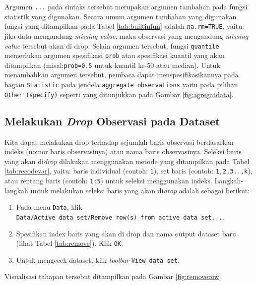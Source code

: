 \documentclass[12pt,]{krantz}
\providecommand{\tightlist}{%
  \setlength{\itemsep}{0pt}\setlength{\parskip}{0pt}}
\begin{document}
Argumen \texttt{...} pada sintaks tersebut merupakan argumen tambahan pada fungsi statistik yang digunakan. Secara umum argumen tambahan yang digunakan fungsi yang ditampilkan pada Tabel \ref{tab:builtinfun} adalah \texttt{na.rm=TRUE}, yaitu: jika data mengandung \emph{missing value}, maka observasi yang mengandung \emph{missing value} tersebut akan di drop. Selain argumen tersebut, fungsi \texttt{quantile} memerlukan argumen spesifikasi \texttt{prob} atau spesifikasi kuantil yang akan ditampilkan (misal:\texttt{prob=0.5} untuk kuantil ke-50 atau median). Untuk menambahkan argumen tersebut, pembaca dapat menspesifikasikannya pada bagian \texttt{Statistic} pada jendela \texttt{aggregate\ observations} yaitu pada pilihan \texttt{Other\ (specify)} seperti yang ditunjukkan pada Gambar \ref{fig:agregatdata}.

\hypertarget{melakukan-drop-observasi-pada-dataset}{%
\subsection{\texorpdfstring{Melakukan \emph{Drop} Observasi pada Dataset}{Melakukan Drop Observasi pada Dataset}}\label{melakukan-drop-observasi-pada-dataset}}

Kita dapat melakukan drop terhadap sejumlah baris observasi berdasarkan indeks (nomor baris observasinya) atau nama baris observasinya. Seleksi baris yang akan di\emph{drop} dilakukan menggunakan metode yang ditampilkan pada Tabel \ref{tab:recodevar}, yaitu: baris individual (contoh: \texttt{1}), set baris (contoh: \texttt{1,2,3..,k}), atau rentang baris (contoh: \texttt{1:5}) untuk seleksi menggunakan indeks. Langkah-langkah untuk melakukan seleksi baris yang akan di\emph{drop} adalah sebagai berikut:

\begin{enumerate}
\def\labelenumi{\arabic{enumi}.}
\tightlist
\item
  Pada menu \texttt{Data}, klik \texttt{Data/Active\ data\ set/Remove\ row(s)\ from\ active\ data\ set...}.
\item
  Spesifikan index baris yang akan di drop dan nama output dataset baru (lihat Tabel \ref{tab:remove}). Klik \texttt{OK}.
\item
  Untuk mengecek dataset, klik \emph{toolbar} \texttt{View\ data\ set}.
\end{enumerate}

Visualisasi tahapan tersebut ditampilkan pada Gambar \ref{fig:removerow}.
\end{document}
